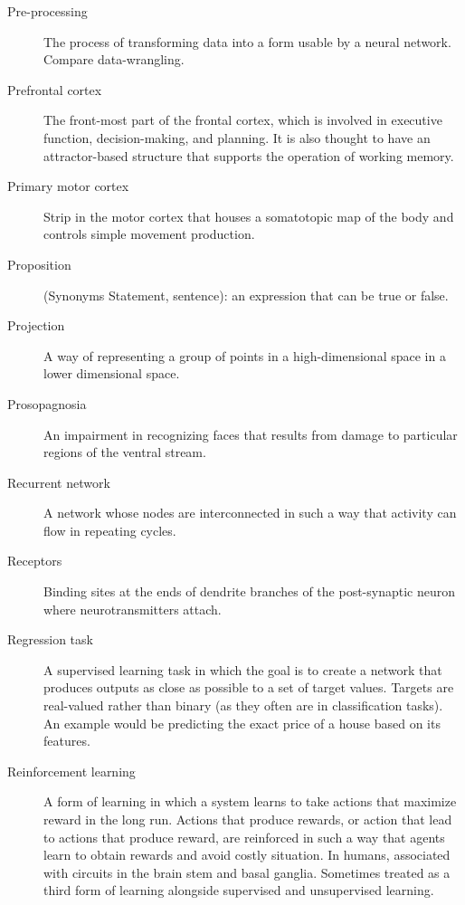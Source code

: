 \begin{description}
\item[Pre-processing] The process of transforming data into a form usable by a neural network. Compare data-wrangling.


\item[Prefrontal cortex] The front-most part of the frontal cortex, which is involved in executive function, decision-making, and planning. It is also thought to have an attractor-based structure that supports the operation of working memory.

\item[Primary motor cortex] Strip in the motor cortex that houses a somatotopic map of the body and controls simple movement production. 

\item[Proposition] (Synonyms Statement, sentence): an expression that can be true or false.

\item[Projection] A way of representing a group of points in a high-dimensional space in a lower dimensional space.

\item[Prosopagnosia] An impairment in recognizing faces that results from damage to particular regions of the ventral stream.


\item[Recurrent network] A network whose nodes are interconnected in such a way that activity can flow in repeating cycles.

\item[Receptors] Binding sites at the ends of dendrite branches of the post-synaptic neuron where neurotransmitters attach.


\item[Regression task] A supervised learning task in which the goal is to create a network that produces outputs as close as possible to a set of target values. Targets are real-valued rather than binary (as they often are in classification tasks). An example would be predicting the exact price of a house based on its features.

\item[Reinforcement learning] A form of learning in which a system learns to take actions that maximize reward in the long run.   Actions that produce rewards, or action that lead to actions that produce reward, are reinforced in such a way that agents learn to obtain rewards and avoid costly situation.  In humans, associated with circuits in the brain stem and basal ganglia.  Sometimes treated as a third form of learning alongside supervised and unsupervised learning.


\end{description}

